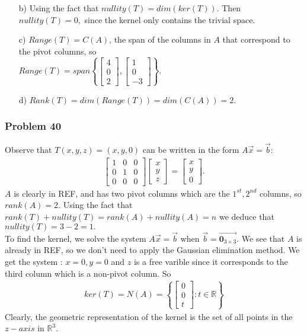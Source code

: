 \documentclass[a4paper,12pt]{article}
\begin{document}
\begin{itemize}
    \item [b)] Using the fact that $nullity(T)=dim(ker(T))$. Then $nullity(T)=0,$ since the kernel only contains the trivial space. 
    \item [c)] $Range(T)=C(A)$, the span of the columns in $A$ that correspond to the pivot columns, so \\$Range(T)= span\left\{\begin{bmatrix}
    4\\
    0\\
    2
    \end{bmatrix}, \begin{bmatrix}
    1\\
    0\\
    -3
    \end{bmatrix}\right\}.$
    \item [d)] $Rank(T)=dim(Range(T))=dim(C(A))=2.$
\end{itemize}
\subsubsection*{Problem 40}
Observe that $T(x,y,z)=(x,y,0)$ can be written in the form $A\vec{x}=\vec{b}:$
\begin{align*}
    \begin{bmatrix}
      1 & 0 & 0 \\
      0 & 1 & 0 \\
      0 & 0 & 0
    \end{bmatrix} \begin{bmatrix}
        x\\
        y\\
        z
    \end{bmatrix} = \begin{bmatrix}
        x\\
        y\\
        0
    \end{bmatrix}.
\end{align*}
$A$ is clearly in REF, and has two pivot columns which are the $1^{st}, 2^{nd}$ columns, so $rank(A)=2.$ Using the fact that $rank(T)+nullity(T)=rank(A)+nullity(A)=n$ we deduce that $nullity(T)=3-2=1.$
\\
To find the kernel, we solve the system $A\vec{x}=\vec{b}$ when $\vec{b}=\vec{\textbf{0}_{3\times 3}}$. We see that $A$ is already in REF, so we don't need to apply the Gaussian elimination method. We get the system : $x=0, y=0$ and $z$ is a free varible since it corresponds to the third column which is a non-pivot column. So \begin{align*}
    ker(T)=N(A)= 
     \left\{
        \begin{bmatrix}
            0\\
            0\\
            t
        \end{bmatrix}: t \in \mathbb{R}
    \right\}
\end{align*}
Clearly, the geometric representation of the kernel is the set of all points in the $z-axis$ in $\mathbb{R}^3.$
\end{document}
